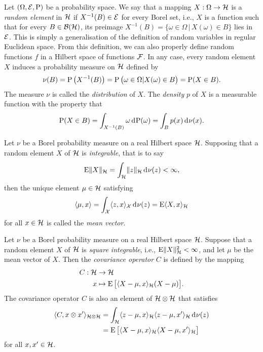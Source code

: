 Let $(\Omega,{\mathcal E},\operatorname{P})$ be a probability space.
We say that a mapping $X:\Omega\to{\mathcal H}$ is a \emph{random element} in ${\mathcal H}$ if $X^{-1}(B)\in{\mathcal E}$ for every Borel set, i.e., $X$ is a function such that for every $B\in{\mathcal B}({\mathcal H})$, its preimage $X^{-1}(B) = \{\omega \in \Omega \,|\, X(\omega) \in B \}$ lies in ${\mathcal E}$.
This is simply a generalisation of the definition of random variables in regular Euclidean space.
From this definition, we can also properly define random functions $f$ in a Hilbert space of functions ${\mathcal F}$.
In any case, every random element $X$ induces a probability measure on ${\mathcal H}$ defined by
\[
  \nu(B) = \operatorname{P}\big(X^{-1}(B)\big) = \operatorname{P}\big( \omega \in \Omega | X(\omega) \in B  \big) = \operatorname{P}(X \in B).
\]
The measure $\nu$ is called the \emph{distribution} of $X$.
The \emph{density} $p$ of $X$ is a measurable function with the property that
\begingroup
\setlength{\abovedisplayskip}{7pt}
\[
  \operatorname{P}(X \in B) = \int_{X^{-1}(B)} \omega \operatorname{d}\hspace{0.5pt}\!\operatorname{P}(\omega) = \int_B p(x) \operatorname{d}\hspace{0.5pt}\!\nu(x).
\]
\endgroup

\begin{definition}
  Let $\nu$ be a Borel probability measure on a real Hilbert space ${\mathcal H}$.
  Supposing that a random element $X$ of ${\mathcal H}$ is \emph{integrable}, that is to say
  \[
    \operatorname{E} \lVert X\rVert_{\mathcal H} = \int_{\mathcal H} \lVert z\rVert_{\mathcal H} \operatorname{d}\hspace{0.5pt}\!\nu(z) < \infty,
  \]
  then the unique element $\mu\in{\mathcal H}$ satisfying 
  \[
    \langle\mu,x\rangle = \int_{\mathcal X} \langle z,x\rangle_{\mathcal X} \operatorname{d}\hspace{0.5pt}\!\nu(z) = \operatorname{E}\langle X,x\rangle_{\mathcal H}
  \]
  for all $x \in {\mathcal H}$ is called the \emph{mean vector}. 
\end{definition}

\begin{definition}\label{def:covoper}
  Let $\nu$ be a Borel probability measure on a real Hilbert space ${\mathcal H}$.
  Suppose that a random element $X$ of ${\mathcal H}$ is \emph{square integrable}, i.e., $\operatorname{E} \lVert X\rVert_{\mathcal H}^2 < \infty$, and let $\mu$ be the mean vector of $X$.
  Then the \emph{covariance operator} $C$ is defined by the mapping
  \begingroup
  \setlength{\abovedisplayskip}{4pt}
  \setlength{\belowdisplayskip}{6pt}
  \begin{align*}
    C:{\mathcal H} &\to {\mathcal H} \\
    x &\mapsto \operatorname{E}\big[\langle X - \mu, x\rangle_{{\mathcal H}}(X - \mu) \big].
  \end{align*}
  \endgroup
  The covariance operator $C$ is also an element of ${\mathcal H}\otimes{\mathcal H}$ that satisfies
  \begingroup
  \setlength{\abovedisplayskip}{13pt}
  \setlength{\belowdisplayskip}{4pt} 
  \begin{align*}
    \langle C,x\otimes x'\rangle_{{\mathcal H}\otimes{\mathcal H}} 
    &= \int_{\mathcal H} \langle z-\mu, x\rangle_{\mathcal H}\langle z-\mu,x'\rangle_{\mathcal H} \operatorname{d}\hspace{0.5pt}\!\nu(z) \\
    &= \operatorname{E}\big[\langle X-\mu,x\rangle_{\mathcal H} \langle X-\mu,x'\rangle_{\mathcal H}\big]
  \end{align*}
  \endgroup
  for all $x,x'\in{\mathcal H}$.
\end{definition}

